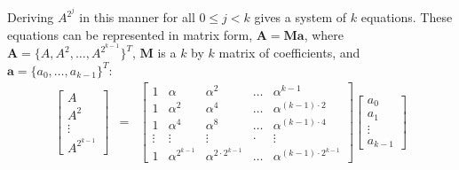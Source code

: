 Deriving $A^{2^j}$ in this manner for all $0\leq j<k$ gives a system
of $k$ equations.
These equations can be represented in matrix form, $\mathbf{A = M a}$, where 
$\mathbf{A}=\{A,A^2,\dots,A^{2^{k-1}}\}^T$, 
$\mathbf{M}$ is
a $k$ by $k$ matrix of coefficients, and $\mathbf{a}=\{a_0,\dots,a_{k-1}\}^T$:
\begin{eqnarray}
\begin{bmatrix}
A \\ A^2 \\ \vdots \\ A^{2^{k-1}}
\end{bmatrix}  &=&
\begin{bmatrix}
1      &   \alpha           & \alpha^2           & \dots & \alpha^{k-1}\\
1      &   \alpha^2         & \alpha^{4}        & \dots & \alpha^{(k-1)\cdot 2}\\
1      &   \alpha^4         & \alpha^{8}        & \dots & \alpha^{(k-1)\cdot 4}\\
\vdots & \vdots             & \vdots             & \cdot     & \vdots \\
1      &   \alpha^{2^{k-1}} & \alpha^{2\cdot 2^{k-1}} & \dots & \alpha^{(k-1)\cdot 2^{k-1}}
\end{bmatrix}
\begin{bmatrix}
a_0 \\ a_1 \\ \vdots \\ a_{k-1}
\end{bmatrix} \label{eqn:matrixFormF2k}
\end{eqnarray}


